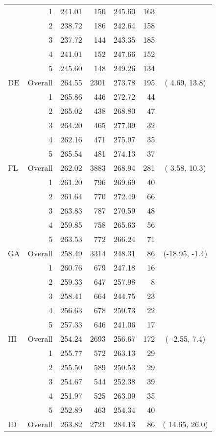 \begin{longtable}{lrrr@{\extracolsep{.25cm}}rrc}
   & 1 & 241.01 & 150 & 245.60 & 163 &  \\ 
   & 2 & 238.72 & 186 & 242.64 & 158 &  \\ 
   & 3 & 237.72 & 144 & 243.35 & 185 &  \\ 
   & 4 & 241.01 & 152 & 247.66 & 152 &  \\ 
   & 5 & 245.60 & 148 & 249.26 & 134 &  \\ 
   \hline
DE & Overall & 264.55 & 2301 & 273.78 & 195 & (  4.69,  13.8) \\ 
   & 1 & 265.86 & 446 & 272.72 &  44 &  \\ 
   & 2 & 265.02 & 438 & 268.80 &  47 &  \\ 
   & 3 & 264.20 & 465 & 277.09 &  32 &  \\ 
   & 4 & 262.16 & 471 & 275.97 &  35 &  \\ 
   & 5 & 265.54 & 481 & 274.13 &  37 &  \\ 
   \hline
FL & Overall & 262.02 & 3883 & 268.94 & 281 & (  3.58,  10.3) \\ 
   & 1 & 261.20 & 796 & 269.69 &  40 &  \\ 
   & 2 & 261.64 & 770 & 272.49 &  66 &  \\ 
   & 3 & 263.83 & 787 & 270.59 &  48 &  \\ 
   & 4 & 259.85 & 758 & 265.63 &  56 &  \\ 
   & 5 & 263.53 & 772 & 266.24 &  71 &  \\ 
   \hline
GA & Overall & 258.49 & 3314 & 248.31 &  86 & (-18.95,  -1.4) \\ 
   & 1 & 260.76 & 679 & 247.18 &  16 &  \\ 
   & 2 & 259.33 & 647 & 257.98 &   8 &  \\ 
   & 3 & 258.41 & 664 & 244.75 &  23 &  \\ 
   & 4 & 256.63 & 678 & 250.73 &  22 &  \\ 
   & 5 & 257.33 & 646 & 241.06 &  17 &  \\ 
   \hline
HI & Overall & 254.24 & 2693 & 256.67 & 172 & ( -2.55,   7.4) \\ 
   & 1 & 255.77 & 572 & 263.13 &  29 &  \\ 
   & 2 & 255.50 & 589 & 250.53 &  29 &  \\ 
   & 3 & 254.67 & 544 & 252.38 &  39 &  \\ 
   & 4 & 251.97 & 525 & 263.09 &  35 &  \\ 
   & 5 & 252.89 & 463 & 254.34 &  40 &  \\ 
   \hline
ID & Overall & 263.82 & 2721 & 284.13 &  86 & ( 14.65,  26.0) \\ 

\end{longtable}
